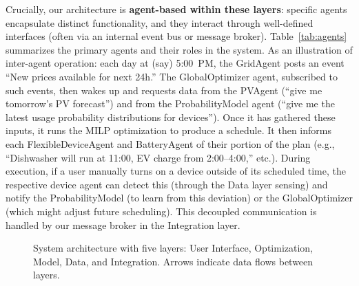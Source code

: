 \documentclass[12pt,a4paper]{article}
\begin{document}
Crucially, our architecture is \textbf{agent-based within these layers}: specific agents encapsulate distinct functionality, and they interact through well-defined interfaces (often via an internal event bus or message broker). Table~\ref{tab:agents} summarizes the primary agents and their roles in the system. As an illustration of inter-agent operation: each day at (say) 5:00~PM, the GridAgent posts an event “New prices available for next 24h.” The GlobalOptimizer agent, subscribed to such events, then wakes up and requests data from the PVAgent (“give me tomorrow’s PV forecast”) and from the ProbabilityModel agent (“give me the latest usage probability distributions for devices”). Once it has gathered these inputs, it runs the MILP optimization to produce a schedule. It then informs each FlexibleDeviceAgent and BatteryAgent of their portion of the plan (e.g., “Dishwasher will run at 11:00, EV charge from 2:00–4:00,” etc.). During execution, if a user manually turns on a device outside of its scheduled time, the respective device agent can detect this (through the Data layer sensing) and notify the ProbabilityModel (to learn from this deviation) or the GlobalOptimizer (which might adjust future scheduling). This decoupled communication is handled by our message broker in the Integration layer.

\begin{figure}[h!]
\centering
{}
\caption{System architecture with five layers: User Interface, Optimization, Model, Data, and Integration. Arrows indicate data flows between layers.}
\label{fig:architecture}
\end{figure}
\end{document}
